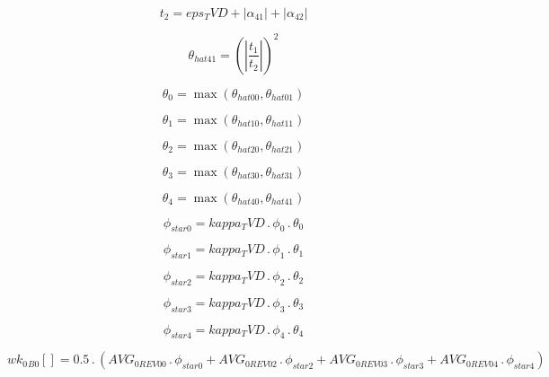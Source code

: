 \documentclass{article}
\begin{document}
\begin{dmath}t_{2} = eps_TVD + \left|{\alpha_{41}}\right| + \left|{\alpha_{42}}\right|\end{dmath}

\begin{dmath}\theta_{hat 41} = \left(\left|{\frac{t_{1}}{t_{2}}}\right| \right)^{2}\end{dmath}

\begin{dmath}\theta_{0} = \max\left(\theta_{hat 00}, \theta_{hat 01}\right)\end{dmath}

\begin{dmath}\theta_{1} = \max\left(\theta_{hat 10}, \theta_{hat 11}\right)\end{dmath}

\begin{dmath}\theta_{2} = \max\left(\theta_{hat 20}, \theta_{hat 21}\right)\end{dmath}

\begin{dmath}\theta_{3} = \max\left(\theta_{hat 30}, \theta_{hat 31}\right)\end{dmath}

\begin{dmath}\theta_{4} = \max\left(\theta_{hat 40}, \theta_{hat 41}\right)\end{dmath}

\begin{dmath}\phi_{star 0} = kappa_TVD \,.\, \phi_{0} \,.\, \theta_{0}\end{dmath}

\begin{dmath}\phi_{star 1} = kappa_TVD \,.\, \phi_{1} \,.\, \theta_{1}\end{dmath}

\begin{dmath}\phi_{star 2} = kappa_TVD \,.\, \phi_{2} \,.\, \theta_{2}\end{dmath}

\begin{dmath}\phi_{star 3} = kappa_TVD \,.\, \phi_{3} \,.\, \theta_{3}\end{dmath}

\begin{dmath}\phi_{star 4} = kappa_TVD \,.\, \phi_{4} \,.\, \theta_{4}\end{dmath}

\begin{dmath}{wk_{0}{_{B0}}}[{}] = 0.5 \,.\, \left(AVG_{0 REV 00} \,.\, \phi_{star 0} + AVG_{0 REV 02} \,.\, \phi_{star 2} + AVG_{0 REV 03} \,.\, \phi_{star 3} + AVG_{0 REV 04} \,.\, \phi_{star 4}\right)\end{dmath}
\end{document}
